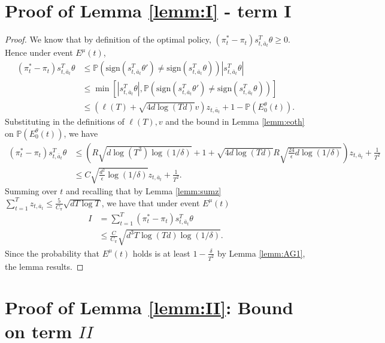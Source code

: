 \documentclass{article}
\begin{document}
\begin{appendices}
\section{Proof of Lemma \ref{lemm:I} - term I}\label{supp:lem1}
\begin{proof}
We know that by definition of the optimal policy, $(\pi^*_t - \pi_t)s_{t,\bar{a}_t}^T \theta \geq 0$. Hence under event $E^\mu(t)$, 
\begin{align*}
(\pi^*_t - \pi_t)s_{t,\bar{a}_t}^T \theta 
&\leq\mathbb{P}\left(\mathrm{sign}(s_{t,\bar{a}_t}^T \theta') \neq \mathrm{sign}(s_{t,\bar{a}_t}^T \theta)\right)|s_{t,\bar{a}_t}^T \theta|\\
&\leq \min\left[|s_{t,\bar{a}_t}^T \theta|, \mathbb{P}(\mathrm{sign}(s_{t,\bar{a}_t}^T \theta') \neq \mathrm{sign}(s_{t,\bar{a}_t}^T \theta))\right]\\
&\leq (\ell(T) + \sqrt{4d\log(Td)}v) z_{t,\bar{a}_t} + 1-\mathbb{P}(E^\theta_0(t)).
\end{align*}
Substituting in the definitions of $\ell(T),v$ and the bound in Lemma \ref{lemm:eoth} on $\mathbb{P}(E^\theta_0(t))$, we have
\begin{align*}
(\pi^*_t - \pi_t)s_{t,\bar{a}_t}^T \theta  &\leq \left(R\sqrt{d \log(T^3) \log(1/\delta)} + 1 + \sqrt{4d\log(Td)}R \sqrt{\frac{24}{\epsilon} d \log(1/\delta)}\right) z_{t,\bar{a}_t} + \frac{1}{T^2}\\
&\leq C\sqrt{\frac{d^2}{\epsilon} \log(1/\delta)} z_{t,\bar{a}_t} + \frac{1}{T^2}.
\end{align*}
Summing over $t$ and recalling that by Lemma \ref{lemm:sumz} $\sum_{t=1}^T z_{t,\bar{a}_t} \leq \frac{5}{C_\pi} \sqrt{dT\log T}$, we have that under event $E^\mu(t)$
\begin{align*}
I &= \sum_{t=1}^T (\pi^*_t - \pi_t)s_{t,\bar{a}_t}^T \theta\\
&\leq  \frac{C}{C_\pi}  \sqrt{d^3 T \log(Td) \log(1/\delta)}.
\end{align*}
Since the probability that $E^\mu(t)$ holds is at least $1-\frac{\delta}{T^2}$ by Lemma \ref{lemm:AG1}, the lemma results.
\end{proof}

\section{Proof of Lemma \ref{lemm:II}: Bound on term $II$}\label{supp:lem2}


\end{appendices}
\end{document}

